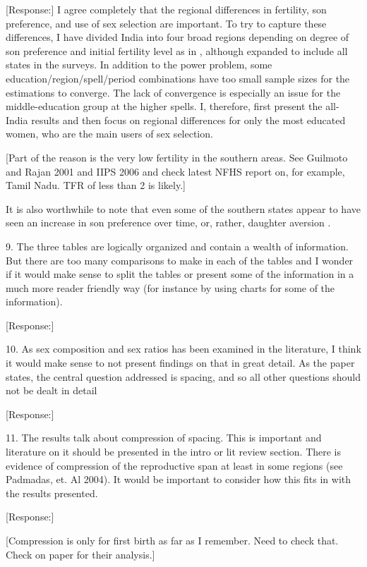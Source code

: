 \documentclass[letterpaper,12pt]{article}
\begin{document}
[Response:]
I agree completely that the regional differences in fertility, son preference, and use 
of sex selection are important.
To try to capture these differences, I have divided India into four broad regions 
depending on degree of son preference and initial fertility level as in 
\citet{retherford03b}, although expanded to include all states in the surveys.
In addition to the power problem, some education/region/spell/period combinations have too 
small sample sizes for the estimations to converge.
The lack of convergence is especially an issue for the middle-education group at the
higher spells.
I, therefore, first present the all-India results and then focus on regional differences
for only the most educated women, who are the main users of sex selection.

[Part of the reason is the very low fertility in the southern areas. See Guilmoto
and Rajan 2001 and IIPS 2006 and check latest NFHS report on, for example, Tamil Nadu.
TFR of less than 2 is likely.]

It is also worthwhile to note that even some of the southern states appear to have
seen an increase in son preference over time, or, rather, daughter aversion
\citep{DiamondSmith2008}.



9. The three tables are logically organized and contain a wealth of
information. But there are too many comparisons to make in each of the
tables and I wonder if it would make sense to split the tables or
present some of the information in a much more reader friendly way (for
instance by using charts for some of the information). 

[Response:]

10. As sex composition and sex ratios has been examined in the literature, I think
it would make sense to not present findings on that in great detail. As
the paper states, the central question addressed is spacing, and so all
other questions should not be dealt in detail

[Response:]

11. The results talk about compression of spacing. This is important and
literature on it should be presented in the intro or lit review section.
There is evidence of compression of the reproductive span at least in
some regions (see Padmadas, et. Al 2004). It would be important to
consider how this fits in with the results presented.

[Response:]

[Compression is only for first birth as far as I remember. Need to check that.
Check on paper for their analysis.]
\end{document}
